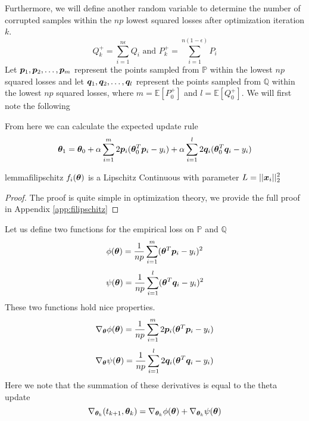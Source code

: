 \documentclass{article} %
\begin{document}
	Furthermore, we will define another random variable to determine the number of corrupted samples within the $np$ lowest squared losses after optimization iteration $k$.
	\begin{equation}
		Q^+_k = \sum_{i=1}^{n\epsilon} Q_i \text{ and } P^+_k = \sum_{i=1}^{n(1-\epsilon)} P_i
	\end{equation}
	Let ${\bm{p}}_1,{\bm{p}}_2,\dots,{\bm{p}}_m$ represent the points sampled from $\mathbb{P}$ within the lowest $np$ squared losses and let ${\bm{q}}_1,{\bm{q}}_2,\dots,{\bm{q}}_l$ represent the points sampled from $\mathbb{Q}$ within the lowest $np$ squared losses, where $m = \mathbb{E}\left[P_0^+\right]$ and $l = \mathbb{E}\left[Q_0^+\right]$. We will first note the following
	
	From here we can calculate the expected update rule
	\begin{equation}
		{\bm{\theta}}_1 = {\bm{\theta}}_0 + \alpha\sum_{i=1}^m2{\bm{p}}_i({\bm{\theta}}^T_0{\bm{p}}_i -y_i) + \alpha\sum_{i=1}^l2{\bm{q}}_i({\bm{\theta}}^T_0{\bm{q}}_i - y_i)
	\end{equation}

	 
	
	\begin{restatable}{lemma}{filipschitz}
		\label{lem:filipschitz}
		$f_i({\bm{\theta}})$ is a Lipschitz Continuous with parameter $\displaystyle L = || {\bm{x}}_i || _2^2$
	\end{restatable}
	\begin{proof}
		The proof is quite simple in optimization theory, we provide the full proof in Appendix \ref{app:filipschitz}
	\end{proof}
	Let us define two functions for the empirical loss on $\mathbb{P}$ and $\mathbb{Q}$
	\begin{equation}
		\phi({\bm{\theta}}) = \frac{1}{np}\sum_{i=1}^m({\bm{\theta}}^T{\bm{p}}_i - y_i)^2
	\end{equation}
	\begin{equation}
		\psi({\bm{\theta}}) = \frac{1}{np}\sum_{i=1}^l({\bm{\theta}}^T{\bm{q}}_i - y_i)^2
	\end{equation}
	These two functions hold nice properties.
	\begin{equation}
		\nabla_{{\bm{\theta}}}\phi({\bm{\theta}}) = \frac{1}{np} \sum_{i=1}^m2{\bm{p}}_i ({\bm{\theta}}^T{\bm{p}}_i - y_i)
	\end{equation}
	\begin{equation}
		\nabla_{{\bm{\theta}}}\psi({\bm{\theta}}) = \frac{1}{np} \sum_{i=1}^l2{\bm{q}}_i({\bm{\theta}}^T{\bm{q}}_i - y_i)
	\end{equation}
	Here we note that the summation of these derivatives is equal to the theta update
	\begin{equation}
		\nabla_{{\bm{\theta}}_k}(t_{k+1},{\bm{\theta}}_k) = \nabla_{{\bm{\theta}}_k}\phi({\bm{\theta}}) + \nabla_{{\bm{\theta}}_k}\psi({\bm{\theta}})
	\end{equation}
	
\end{document}
